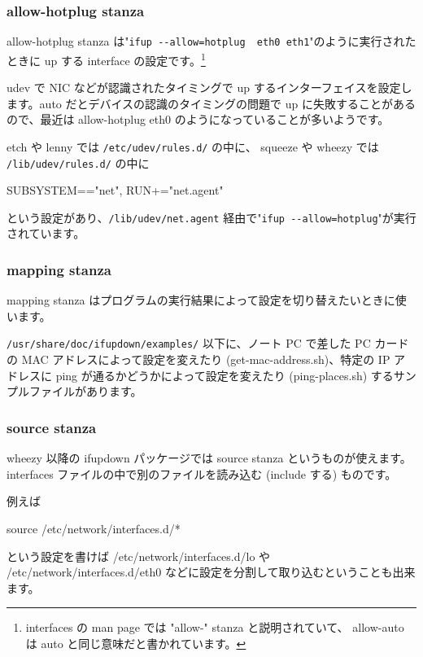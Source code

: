 \documentclass[mingoth,a4paper,twoside]{jsarticle}
\begin{document}
\subsubsection{allow-hotplug stanza}

allow-hotplug stanza は"\verb+ifup --allow=hotplug  eth0 eth1+"のように実行されたときに up する interface の設定です。\footnote{interfaces の man page では "allow-" stanza と説明されていて、 allow-auto は auto と同じ意味だと書かれています。}

udev で NIC などが認識されたタイミングで up するインターフェイスを設定します。auto だとデバイスの認識のタイミングの問題で up に失敗することがあるので、最近は allow-hotplug eth0 のようになっていることが多いようです。

etch や lenny では \verb+/etc/udev/rules.d/+ の中に、
squeeze や wheezy では \verb+/lib/udev/rules.d/+ の中に

\begin{commandline}
  SUBSYSTEM=="net", RUN+="net.agent"
\end{commandline}

という設定があり、\verb+/lib/udev/net.agent+ 経由で"\verb+ifup --allow=hotplug+"が実行されています。

\subsubsection{mapping stanza}
mapping stanza はプログラムの実行結果によって設定を切り替えたいときに使います。

\verb+/usr/share/doc/ifupdown/examples/+ 以下に、ノート PC で差した PC カードの MAC アドレスによって設定を変えたり (get-mac-address.sh)、特定の IP アドレスに ping が通るかどうかによって設定を変えたり (ping-places.sh) するサンプルファイルがあります。

\subsubsection{source stanza}

wheezy 以降の ifupdown パッケージでは source stanza というものが使えます。
interfaces ファイルの中で別のファイルを読み込む (include する) ものです。

例えば

\begin{commandline}
source /etc/network/interfaces.d/*
\end{commandline}

という設定を書けば /etc/network/interfaces.d/lo や /etc/network/interfaces.d/eth0 などに設定を分割して取り込むということも出来ます。
\end{document}
